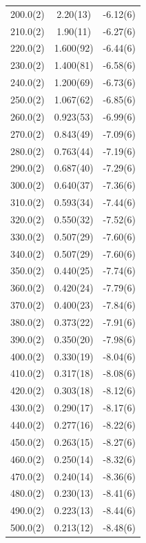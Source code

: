 \begin{longtable}{S[table-format=3.1(1)] S[table-format=3.4(4)] S[table-format=3.4(4)]}
        200.0(2) & 2.20(13) & -6.12(6) \\ 
        210.0(2) & 1.90(11) & -6.27(6) \\ 
        220.0(2) & 1.600(92) & -6.44(6) \\ 
        230.0(2) & 1.400(81) & -6.58(6) \\ 
        240.0(2) & 1.200(69) & -6.73(6) \\ 
        250.0(2) & 1.067(62) & -6.85(6) \\ 
        260.0(2) & 0.923(53) & -6.99(6) \\ 
        270.0(2) & 0.843(49) & -7.09(6) \\ 
        280.0(2) & 0.763(44) & -7.19(6) \\ 
        290.0(2) & 0.687(40) & -7.29(6) \\ 
        300.0(2) & 0.640(37) & -7.36(6) \\ 
        310.0(2) & 0.593(34) & -7.44(6) \\ 
        320.0(2) & 0.550(32) & -7.52(6) \\ 
        330.0(2) & 0.507(29) & -7.60(6) \\ 
        340.0(2) & 0.507(29) & -7.60(6) \\ 
        350.0(2) & 0.440(25) & -7.74(6) \\ 
        360.0(2) & 0.420(24) & -7.79(6) \\ 
        370.0(2) & 0.400(23) & -7.84(6) \\ 
        380.0(2) & 0.373(22) & -7.91(6) \\ 
        390.0(2) & 0.350(20) & -7.98(6) \\ 
        400.0(2) & 0.330(19) & -8.04(6) \\ 
        410.0(2) & 0.317(18) & -8.08(6) \\ 
        420.0(2) & 0.303(18) & -8.12(6) \\ 
        430.0(2) & 0.290(17) & -8.17(6) \\ 
        440.0(2) & 0.277(16) & -8.22(6) \\ 
        450.0(2) & 0.263(15) & -8.27(6) \\ 
        460.0(2) & 0.250(14) & -8.32(6) \\ 
        470.0(2) & 0.240(14) & -8.36(6) \\ 
        480.0(2) & 0.230(13) & -8.41(6) \\ 
        490.0(2) & 0.223(13) & -8.44(6) \\ 
        500.0(2) & 0.213(12) & -8.48(6) \\ 

\end{longtable}
